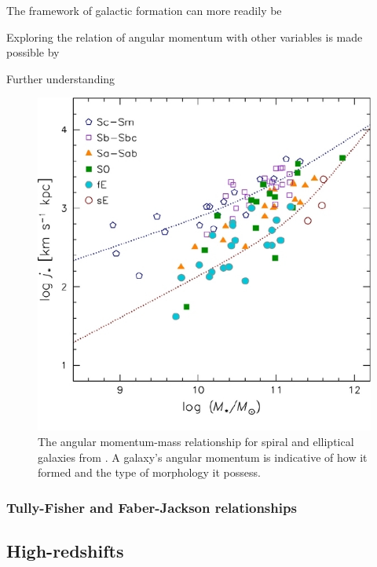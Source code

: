 \documentclass[12pt, twocolumn]{revtex4-1}    %
\begin{document}
The framework of galactic formation can more readily be 

Exploring the relation of angular momentum with other variables is made possible by 

Further understanding 
\begin{figure}
\includegraphics[width=1.0\linewidth]{introduction/romanowsky_2012_fig_3}
\captionsetup{justification=raggedright}
\caption{The angular momentum-mass relationship for spiral and elliptical galaxies from \cite{2012ApJS..203...17R}. A galaxy's angular momentum is indicative of how it formed and the type of morphology it possess.}
\label{fig:romanowsky_fall_2012}
\end{figure}


\vspace{4ex}
\subsubsection{Tully-Fisher and Faber-Jackson relationships}


\subsection{High-redshifts}
\end{document}
